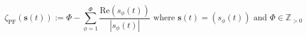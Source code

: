 \begin{equation}
	\zeta_\text{PF}(\textbf{s}(t)):= \Phi - \sum_{\phi=1}^{\Phi}\frac{\text{Re}(s_\phi(t))}{|s_\phi(t)|}  \text{ where } \textbf{s}(t) = (s_\phi(t)) \text{ and } \Phi \in \mathbb{Z}_{>0}
\label{ch1:equ:power-factor}
\end{equation}